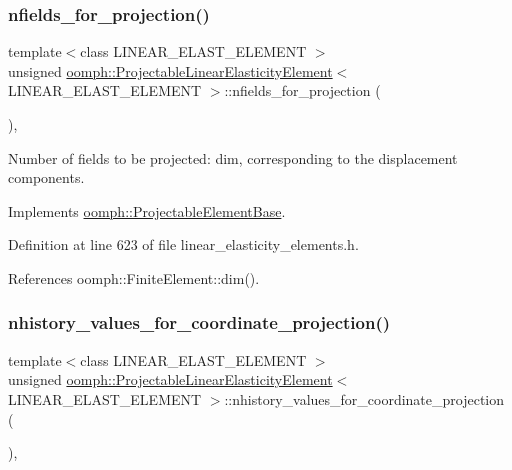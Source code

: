 \subsubsection{\texorpdfstring{nfields\+\_\+for\+\_\+projection()}{nfields\_for\_projection()}}
{\footnotesize\ttfamily template$<$class L\+I\+N\+E\+A\+R\+\_\+\+E\+L\+A\+S\+T\+\_\+\+E\+L\+E\+M\+E\+NT $>$ \\
unsigned \hyperlink{classoomph_1_1ProjectableLinearElasticityElement}{oomph\+::\+Projectable\+Linear\+Elasticity\+Element}$<$ L\+I\+N\+E\+A\+R\+\_\+\+E\+L\+A\+S\+T\+\_\+\+E\+L\+E\+M\+E\+NT $>$\+::nfields\+\_\+for\+\_\+projection (\begin{DoxyParamCaption}{ }\end{DoxyParamCaption})\hspace{0.3cm}{\ttfamily [inline]}, {\ttfamily [virtual]}}



Number of fields to be projected\+: dim, corresponding to the displacement components. 



Implements \hyperlink{classoomph_1_1ProjectableElementBase_a44634aa4049332a580d249c25564638c}{oomph\+::\+Projectable\+Element\+Base}.



Definition at line 623 of file linear\+\_\+elasticity\+\_\+elements.\+h.



References oomph\+::\+Finite\+Element\+::dim().

\mbox{\label{classoomph_1_1ProjectableLinearElasticityElement_af147f2ea0fb696ae5e32b21c7b877dfb}} 
\subsubsection{\texorpdfstring{nhistory\+\_\+values\+\_\+for\+\_\+coordinate\+\_\+projection()}{nhistory\_values\_for\_coordinate\_projection()}}
{\footnotesize\ttfamily template$<$class L\+I\+N\+E\+A\+R\+\_\+\+E\+L\+A\+S\+T\+\_\+\+E\+L\+E\+M\+E\+NT $>$ \\
unsigned \hyperlink{classoomph_1_1ProjectableLinearElasticityElement}{oomph\+::\+Projectable\+Linear\+Elasticity\+Element}$<$ L\+I\+N\+E\+A\+R\+\_\+\+E\+L\+A\+S\+T\+\_\+\+E\+L\+E\+M\+E\+NT $>$\+::nhistory\+\_\+values\+\_\+for\+\_\+coordinate\+\_\+projection (\begin{DoxyParamCaption}{ }\end{DoxyParamCaption})\hspace{0.3cm}{\ttfamily [inline]}, {\ttfamily [virtual]}}



